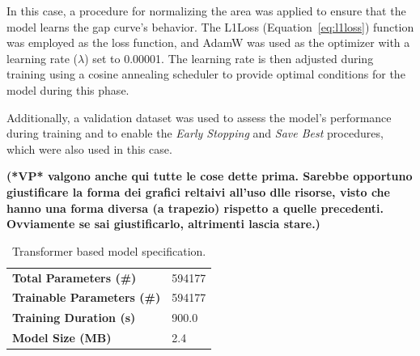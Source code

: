 In this case, a procedure for normalizing the area was applied to ensure that the
model learns the gap curve's behavior.
The L1Loss (Equation~\ref{eq:l1loss}) function was employed as the loss function, and AdamW\cite{adamw} was used as the
optimizer with a learning rate ($\lambda$) set to 0.00001.
The learning rate is then adjusted during training using a cosine annealing scheduler\cite{scheduler1}\cite{scheduler2}
to provide optimal conditions for the model during this phase.

Additionally, a validation dataset was used to assess the model's
performance during training and to enable the
\textit{Early Stopping} and \textit{Save Best} procedures,
which were also used in this case.

	{\bf (*VP* valgono anche qui tutte le cose dette prima. Sarebbe opportuno giustificare la forma dei grafici reltaivi all'uso dlle risorse, visto che hanno una forma diversa (a trapezio) rispetto a quelle precedenti. Ovviamente se sai giustificarlo, altrimenti lascia stare.)}


\begin{table}[H]
	\begin{center}
		\begin{tabular}[c]{l|l}
			\textbf{Total Parameters (\#)}     & 594177 \\
			\textbf{Trainable Parameters (\#)} & 594177 \\
			\textbf{Training Duration (s)}     & 900.0  \\
			\textbf{Model Size (MB)}           & 2.4
		\end{tabular}
	\end{center}
	\caption{Transformer based model specification.}\label{tab:gabspecs}
\end{table}

